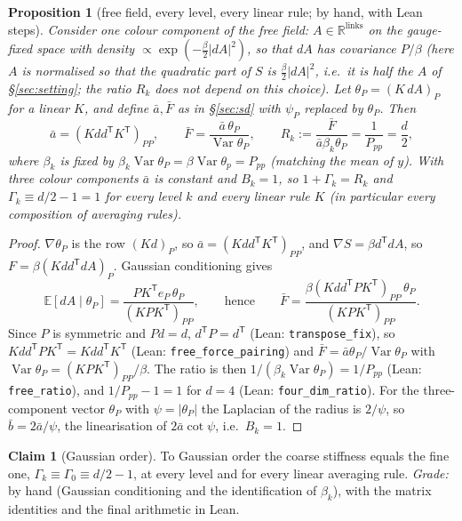 \documentclass[11pt,a4paper]{article}
\newtheorem{proposition}[theorem]{Proposition}
\theoremstyle{definition}
\newtheorem{claim}[theorem]{Claim}
\theoremstyle{remark}
\newcommand{\E}{\mathbb{E}}
\newcommand{\code}[1]{\texttt{#1}}
\newcommand{\abar}{\bar a}
\newcommand{\bbar}{\bar b}
\newcommand{\Fbar}{\bar F}
\begin{document}
\begin{proposition}[free field, every level, every linear rule; by hand, with Lean steps]\label{prop:free}
Consider one colour component of the free field: $A\in\mathbb R^{\text{links}}$ on the gauge-fixed space with density $\propto\exp(-\tfrac\beta2|dA|^2)$, so that $dA$ has covariance $P/\beta$ (here $A$ is normalised so that the quadratic part of $S$ is $\frac\beta2|dA|^2$, i.e.\ it is half the $A$ of \S\ref{sec:setting}; the ratio $R_k$ does not depend on this choice). Let $\theta_P=(K\,dA)_P$ for a linear $K$, and define $\abar,\Fbar$ as in \S\ref{sec:sd} with $\psi_P$ replaced by $\theta_P$. Then
\[
\abar=(Kdd^{\mathsf T}K^{\mathsf T})_{PP},\qquad \Fbar=\frac{\abar\,\theta_P}{\operatorname{Var}\theta_P},\qquad R_k:=\frac{\Fbar}{\abar\beta_k\theta_P}=\frac1{P_{pp}}=\frac d2,
\]
where $\beta_k$ is fixed by $\beta_k\operatorname{Var}\theta_P=\beta\operatorname{Var}\theta_p=P_{pp}$ (matching the mean of $y$). With three colour components $\abar$ is constant and $B_k=1$, so $1+\Gamma_k=R_k$ and $\Gamma_k\equiv d/2-1=1$ for every level $k$ and every linear rule $K$ (in particular every composition of averaging rules).
\end{proposition}

\begin{proof}
$\nabla\theta_P$ is the row $(Kd)_P$, so $\abar=(Kdd^{\mathsf T}K^{\mathsf T})_{PP}$, and $\nabla S=\beta d^{\mathsf T}dA$, so $F=\beta(Kdd^{\mathsf T}dA)_P$. Gaussian conditioning gives
\[
\E[dA\mid\theta_P]=\frac{PK^{\mathsf T}e_P\,\theta_P}{(KPK^{\mathsf T})_{PP}},\qquad\text{hence}\qquad \Fbar=\frac{\beta(Kdd^{\mathsf T}PK^{\mathsf T})_{PP}\,\theta_P}{(KPK^{\mathsf T})_{PP}}.
\] Since $P$ is symmetric and $Pd=d$, $d^{\mathsf T}P=d^{\mathsf T}$ (Lean: \code{transpose\_fix}), so $Kdd^{\mathsf T}PK^{\mathsf T}=Kdd^{\mathsf T}K^{\mathsf T}$ (Lean: \code{free\_force\_pairing}) and $\Fbar=\abar\theta_P/\operatorname{Var}\theta_P$ with $\operatorname{Var}\theta_P=(KPK^{\mathsf T})_{PP}/\beta$. The ratio is then $1/(\beta_k\operatorname{Var}\theta_P)=1/P_{pp}$ (Lean: \code{free\_ratio}), and $1/P_{pp}-1=1$ for $d=4$ (Lean: \code{four\_dim\_ratio}). For the three-component vector $\theta_P$ with $\psi=|\theta_P|$ the Laplacian of the radius is $2/\psi$, so $\bbar=2\abar/\psi$, the linearisation of $2\abar\cot\psi$, i.e.\ $B_k=1$.
\end{proof}

\begin{claim}[Gaussian order]\label{claim:gauss}
To Gaussian order the coarse stiffness equals the fine one, $\Gamma_k\equiv\Gamma_0\equiv d/2-1$, at every level and for every linear averaging rule. \emph{Grade:} by hand (Gaussian conditioning and the identification of $\beta_k$), with the matrix identities and the final arithmetic in Lean.
\end{claim}
\end{document}
